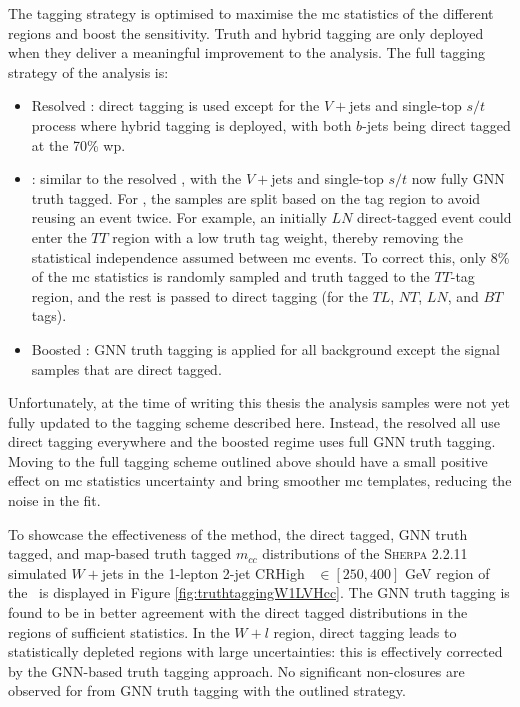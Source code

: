 The tagging strategy is optimised to maximise the \gls{mc} statistics of the different regions and boost the sensitivity. Truth and hybrid tagging are only deployed when they deliver a meaningful improvement to the analysis. The full tagging strategy of the analysis is:
\begin{itemize}
  \item Resolved \vhb: direct tagging is used except for the $V+$jets and single-top $s/t$ process where hybrid tagging is deployed, with both $b$-jets being direct tagged at the 70\% \gls{wp}.
  \item \vhc: similar to the resolved \vhb, with the $V+$jets and single-top $s/t$ now fully GNN truth tagged. For \vhc, the samples are split based on the tag region to avoid reusing an event twice. For example, an initially $LN$ direct-tagged event could enter the $TT$ region with a low truth tag weight, thereby removing the statistical independence assumed between \gls{mc} events. To correct this, only 8\% of the \gls{mc} statistics is randomly sampled and truth tagged to the $TT$-tag region, and the rest is passed to direct tagging (for the $TL$, $NT$, $LN$, and $BT$ tags). 
  \item Boosted \vhb: GNN truth tagging is applied for all background except the signal samples that are direct tagged.
\end{itemize}
Unfortunately, at the time of writing this thesis the analysis samples were not yet fully updated to the tagging scheme described here. Instead, the resolved \vhbc all use direct tagging everywhere and the boosted regime uses full GNN truth tagging. Moving to the full tagging scheme outlined above should have a small positive effect on \gls{mc} statistics uncertainty and bring smoother \gls{mc} templates, reducing the noise in the fit.

To showcase the effectiveness of the method, the direct tagged, GNN truth tagged, and map-based truth tagged $m_{cc}$ distributions of the \textsc{Sherpa} 2.2.11 simulated $W+$jets in the 1-lepton 2-jet CRHigh \ptv\ $\in [250, 400]$ GeV region of the \vhc\ is displayed in Figure \ref{fig:truthtaggingW1LVHcc}. The GNN truth tagging is found to be in better agreement with the direct tagged distributions in the regions of sufficient statistics. In the $W+l$ region, direct tagging leads to statistically depleted regions with large uncertainties: this is effectively corrected by the GNN-based truth tagging approach. No significant non-closures are observed for from GNN truth tagging with the outlined strategy.

